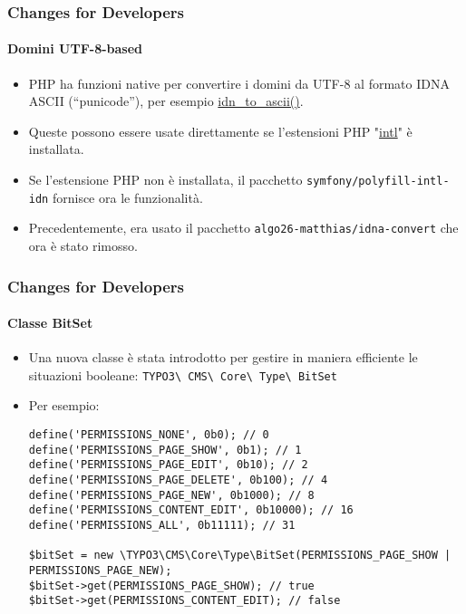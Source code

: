 \begin{frame}[fragile]
	\frametitle{Changes for Developers}
	\framesubtitle{Domini UTF-8-based}

	\begin{itemize}
		\item PHP ha funzioni native per convertire i domini da UTF-8 al formato IDNA ASCII (“punicode”),
			per esempio \href{https://www.php.net/manual/en/function.idn-to-ascii.php}{idn\_to\_ascii()}.

		\item Queste possono essere usate direttamente se l'estensioni PHP
			"\href{https://www.php.net/manual/en/book.intl.php}{intl}" è installata.

		\item Se l'estensione PHP non è installata, il pacchetto \texttt{symfony/polyfill-intl-idn}
			fornisce ora le funzionalità.

		\item Precedentemente, era usato il pacchetto \texttt{algo26-matthias/idna-convert} che ora è stato rimosso.

	\end{itemize}

\end{frame}


\begin{frame}[fragile]
	\frametitle{Changes for Developers}
	\framesubtitle{Classe BitSet}

	\lstset{basicstyle=\tiny\ttfamily}

	\begin{itemize}
		\item Una nuova classe è stata introdotto per gestire in maniera efficiente le situazioni booleane:\newline
			\texttt{TYPO3\textbackslash
				CMS\textbackslash
				Core\textbackslash
				Type\textbackslash
				BitSet}

		\item Per esempio:

\begin{lstlisting}
define('PERMISSIONS_NONE', 0b0); // 0
define('PERMISSIONS_PAGE_SHOW', 0b1); // 1
define('PERMISSIONS_PAGE_EDIT', 0b10); // 2
define('PERMISSIONS_PAGE_DELETE', 0b100); // 4
define('PERMISSIONS_PAGE_NEW', 0b1000); // 8
define('PERMISSIONS_CONTENT_EDIT', 0b10000); // 16
define('PERMISSIONS_ALL', 0b11111); // 31

$bitSet = new \TYPO3\CMS\Core\Type\BitSet(PERMISSIONS_PAGE_SHOW | PERMISSIONS_PAGE_NEW);
$bitSet->get(PERMISSIONS_PAGE_SHOW); // true
$bitSet->get(PERMISSIONS_CONTENT_EDIT); // false
\end{lstlisting}

	\end{itemize}

\end{frame}

